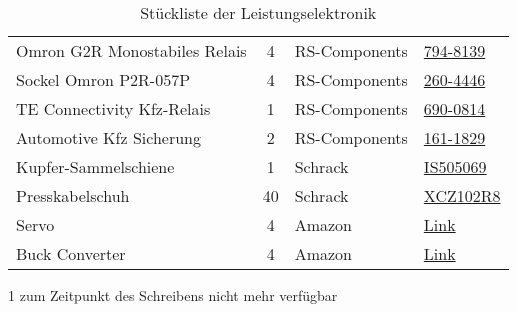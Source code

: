 \begin{table}[h]
\begin{threeparttable}
\begin{tabular}{|l|c|M{3cm}|l|}
    Omron G2R Monostabiles Relais & 4 & RS-Components & \href{https://at.rs-online.com/web/p/monostabile-relais/7948139/}{794-8139}\\
    Sockel Omron P2R-057P & 4 & RS-Components & \href{https://at.rs-online.com/web/p/einbaumessgerate-zubehor/2604446/}{260-4446}\\
    TE Connectivity Kfz-Relais & 1 & RS-Components & \href{https://at.rs-online.com/web/p/monostabile-relais/6900814}{690-0814} \\
    Automotive Kfz Sicherung & 2 & RS-Components & \href{https://at.rs-online.com/web/p/kfz-sicherungen/1611829/}{161-1829}\\\hline
    Kupfer-Sammelschiene & 1 & Schrack & \href{https://www.schrack.at/shop/verteilereinbau-ls-fi-ueberspannungsableiter-d0-und-nh/schmelzsicherungs-und-sammelschienensysteme/sammelschienensysteme/sammelschienen/kupfersammelschiene/kupfer-sammelschiene-blank-379-a-450-a-30x5mm-2m-is505069.html}{IS505069}\\
    Presskabelschuh & 40 & Schrack & \href{https://www.schrack.at/shop/kabel-leitungen/presskabelschuh-kabelzubehoer/din-presskabelschuhe/presskabelschuh-10mm2-m8-xcz102r8.html}{XCZ102R8}\\\hline
    Servo & 4 & Amazon & \href{https://www.amazon.de/-/en/gp/product/B07T6DNLV4/}{Link}\\
    Buck Converter & 4 & Amazon & \href{https://www.amazon.de/gp/product/B085DSMFQM/ref=ppx_yo_dt_b_asin_image_o03_s00?ie=UTF8&psc=1}{Link} \\\hline 
    \end{tabular}
    \begin{tablenotes}\footnotesize 
        \item[1] zum Zeitpunkt des Schreibens nicht mehr verfügbar 
    \end{tablenotes}
\end{threeparttable}
    \caption{Stückliste der Leistungselektronik}
\end{table}

\newpage